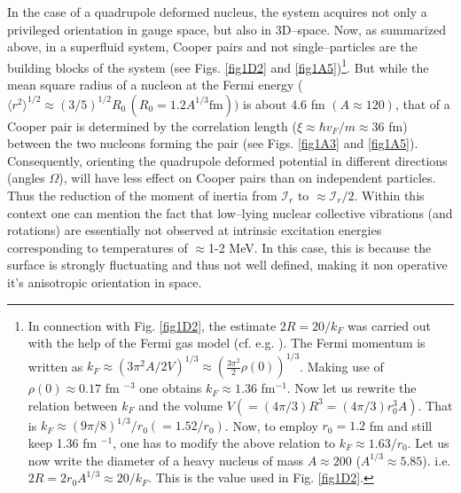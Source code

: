 In the case of a quadrupole deformed nucleus, the system acquires not only a privileged orientation in gauge space, but also in 3D--space. Now, as summarized above, in a superfluid system, Cooper pairs and not single--particles are the building blocks of the system (see Figs. \ref{fig1D2} and \ref{fig1A5})\footnote{In connection with Fig. \ref{fig1D2}, the estimate $2R=20/k_F$ was carried out with the help of the Fermi gas model (cf. e.g. \cite{Bohr:69}). The Fermi momentum is written as $k_F\approx (3\pi^2 A/2V)^{1/3}\approx (\frac{3\pi^2}{2}\rho(0))^{1/3}$. Making use of $\rho(0)\approx 0.17$ fm $^{-3}$ one obtains $k_F\approx 1.36 $ fm$^{-1}$. Now let us rewrite the relation between $k_F$ and the volume $V(=(4\pi/3) R^3=(4\pi/3) r_0^3 A)$. That is $k_F\approx (9\pi/8)^{1/3}/r_0(=1.52/r_0)$. Now, to employ $r_0=1.2$ fm and still keep 1.36 fm $^{-1}$, one has to modify the above relation to $k_F\approx 1.63/r_0$. Let us now write the diameter of a heavy nucleus of mass $A\approx 200$ ($A^{1/3}\approx 5.85$). i.e. $2R=2r_0A^{1/3}\approx 20/k_F$.
 This is the value used in Fig. \ref{fig1D2}.}. But while the mean square radius of a nucleon at the Fermi energy ($\langle r^2\rangle^{1/2}\approx (3/5)^{1/2}R_0 \,(R_0=1.2 A^{1/3}\text{fm}))$ is about 4.6 fm $(A\approx 120)$, that of a Cooper pair is determined by the correlation length ($\xi\approx\hbar v_F/m\approx 36$ fm) between the two nucleons forming the pair (see Figs. \ref{fig1A3} and \ref{fig1A5}). Consequently, orienting the quadrupole deformed potential in different directions (angles $\Omega$), will have  less  effect on Cooper pairs than on independent particles. Thus the reduction of the moment of inertia from $\mathcal I_r$ to $\approx\mathcal{I}_r/2$. Within this context one can mention the fact that low--lying nuclear collective vibrations (and rotations) are essentially not observed at intrinsic excitation energies corresponding to temperatures of $\approx$1-2 MeV. In this case, this is because the surface is strongly fluctuating and thus not well defined, making it non operative it's anisotropic orientation in space.
